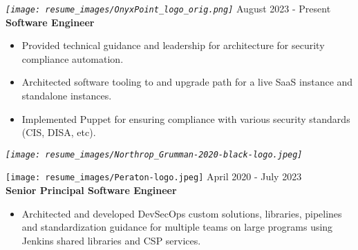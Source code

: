 \documentclass[12pt, line, margin]{res}
\begin{document}
\begin{resume}
            {\sl
              \texttt{[image: resume\_images/OnyxPoint\_logo\_orig.png]}
            }
            \hfill August 2023 - Present \\
            \textbf{Software Engineer}
            \begin{itemize}  [nolistsep, noitemsep, topsep=0px, parsep=0px, partopsep=0px] %
              \item   Provided technical guidance and leadership for architecture \newline
                          for security compliance automation.
              \item   Architected software tooling to and upgrade path for a live \newline
                          SaaS instance and standalone instances.
              \item   Implemented Puppet for ensuring compliance \newline
                          with various security standards (CIS, DISA, etc).
            \end{itemize}
            {\sl
              \texttt{[image: resume\_images/Northrop\_Grumman-2020-black-logo.jpeg]}
            }
            \texttt{[image: resume\_images/Peraton-logo.jpeg]}
            \hfill April 2020 - July 2023 \\
            \textbf{Senior Principal Software Engineer}
            \begin{itemize}  \itemsep -2pt %
              \item   Architected and developed DevSecOps custom solutions, libraries,
                          pipelines and standardization guidance for multiple teams on large \newline
                          programs using Jenkins shared libraries and CSP services.

\end{itemize}
\end{resume}
\end{document}
